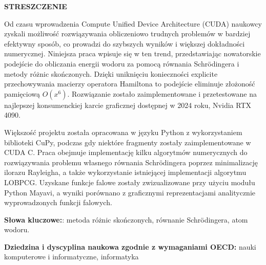 \noindent
\begingroup
\fontsize{12pt}{1.5pt}\selectfont
\textbf{STRESZCZENIE}
\endgroup

\vspace{3mm}

Od czasu wprowadzenia Compute Unified Device Architecture (CUDA) naukowcy zyskali możliwość rozwiązywania obliczeniowo trudnych problemów w bardziej efektywny sposób, co prowadzi do szybszych wyników i większej dokładności numerycznej. Niniejsza praca wpisuje się w ten trend, przedstawiając nowatorskie podejście do obliczania energii wodoru za pomocą równania Schrödingera i metody różnic skończonych. Dzięki uniknięciu konieczności explicite przechowywania macierzy operatora Hamiltona to podejście eliminuje złożoność pamięciową $O(x^6)$. Rozwiązanie zostało zaimplementowane i przetestowane na najlepszej konsumenckiej karcie graficznej dostępnej w 2024 roku, Nvidia RTX 4090.

Większość projektu została opracowana w języku Python z wykorzystaniem biblioteki CuPy, podczas gdy niektóre fragmenty zostały zaimplementowane w CUDA C. Praca obejmuje implementację kilku algorytmów numerycznych do rozwiązywania problemu własnego równania Schrödingera poprzez minimalizację ilorazu Rayleigha, a także wykorzystanie istniejącej implementacji algorytmu LOBPCG. Uzyskane funkcje falowe zostały zwizualizowane przy użyciu modułu Python Mayavi, a wyniki porównano z graficznymi reprezentacjami analitycznie wyprowadzonych funkcji falowych.

\textbf{Słowa kluczowe:}: metoda różnic skończonych, równanie Schrödingera, atom wodoru.

\textbf{Dziedzina i dyscyplina naukowa zgodnie z wymaganiami OECD:}
nauki komputerowe i informatyczne, informatyka